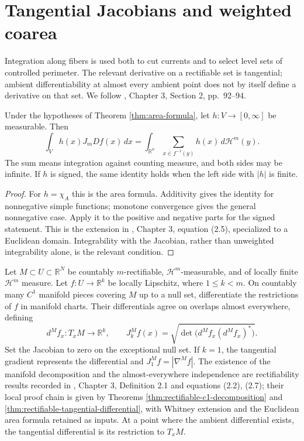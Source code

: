 \chapter{Tangential Jacobians and weighted coarea}\label{sec:weighted-coarea}
Integration along fibers is used both to cut currents and to select level sets of controlled perimeter. The relevant derivative on a rectifiable set is tangential; ambient differentiability at almost every ambient point does not by itself define a derivative on that set. We follow \cite{Sim18}, Chapter 3, Section 2, pp.~92--94.

\begin{proposition}\label{prop:weighted-area}
Under the hypotheses of Theorem \ref{thm:area-formula}, let $h:V\to[0,\infty]$ be measurable. Then
\[
 \int_V h(x)J_mDf(x)\,dx
 =\int_{\mathbb R^n}\sum_{x\in f^{-1}(y)}h(x)\,d\mathcal H^m(y).
\]
The sum means integration against counting measure, and both sides may be infinite. If $h$ is signed, the same identity holds when the left side with $|h|$ is finite.
\end{proposition}
\begin{proof}
For $h=\chi_A$ this is the area formula. Additivity gives the identity for nonnegative simple functions; monotone convergence gives the general nonnegative case. Apply it to the positive and negative parts for the signed statement. This is the extension in \cite{Sim18}, Chapter 3, equation (2.5), specialized to a Euclidean domain. Integrability with the Jacobian, rather than unweighted integrability alone, is the relevant condition.
\end{proof}

\begin{definition}\label{def:tangential-coarea-jacobian}
Let $M\subset U\subset\mathbb R^N$ be countably $m$-rectifiable, $\mathcal H^m$-measurable, and of locally finite $\mathcal H^m$ measure. Let $f:U\to\mathbb R^k$ be locally Lipschitz, where $1\leq k<m$. On countably many $C^1$ manifold pieces covering $M$ up to a null set, differentiate the restrictions of $f$ in manifold charts. Their differentials agree on overlaps almost everywhere, defining
\[
 d^Mf_x:T_xM\to\mathbb R^k,\qquad
 J^M_kf(x)=\sqrt{\det\bigl(d^Mf_x(d^Mf_x)^*\bigr)}.
\]
Set the Jacobian to zero on the exceptional null set. If $k=1$, the tangential gradient represents the differential and $J^M_1f=|\nabla^Mf|$. The existence of the manifold decomposition and the almost-everywhere independence are rectifiability results recorded in \cite{Sim18}, Chapter 3, Definition 2.1 and equations (2.2), (2.7); their local proof chain is given by Theorems \ref{thm:rectifiable-c1-decomposition} and \ref{thm:rectifiable-tangential-differential}, with Whitney extension and the Euclidean area formula retained as inputs. At a point where the ambient differential exists, the tangential differential is its restriction to $T_xM$.
\end{definition}

